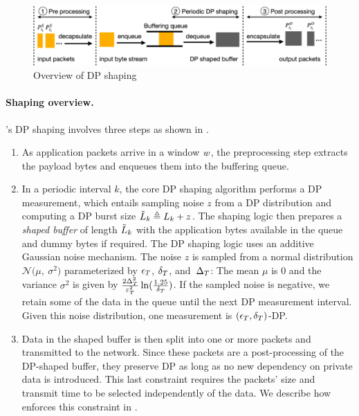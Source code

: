 \begin{figure}[t]
    \centering
    \includegraphics[width=\columnwidth]{figures/dp-overview.pdf}
    \caption{Overview of DP shaping}
    \label{fig:dp-overview}
\end{figure}

\paragraph{Shaping overview.}
\sys's DP shaping involves three steps as shown in .
\begin{enumerate}
    \item As application packets arrive in a window $w$, the preprocessing step extracts the payload bytes and enqueues them into the buffering queue.
    \item In a periodic interval $k$, the core DP shaping algorithm performs a DP measurement, which entails sampling noise $z$ from a DP distribution and computing a DP burst size $\tilde{L}_{k} \triangleq L_{k} + z$.
    The shaping logic then prepares a {\em shaped buffer} of length $\tilde{L}_{k}$ with the application bytes available in the queue and dummy bytes if required.
    The DP shaping logic uses an additive Gaussian noise mechanism.
    The noise $z$ is sampled from a normal distribution $\mathcal{N}\big(\mu,~\sigma^2\big)$ parameterized by $\epsilon_T$, $\delta_T$, and~$\Delta_T$:
    The mean $\mu$ is 0 and the variance $\sigma^2$ is given by $\frac{2\Delta_T^2}{\varepsilon_T^2}\ln(\frac{1.25}{\delta_T})$.
    If the sampled noise is negative, we retain some of the data in the queue until the next DP measurement interval.
    Given this noise distribution, one measurement is \mbox{$(\epsilon_T, \delta_T)$-DP}.
    \item Data in the shaped buffer is then split into one or more packets and transmitted to the network. Since these packets are a post-processing of the DP-shaped buffer, they preserve DP as long as no new dependency on private data is introduced. 
    This last constraint requires the packets' size and transmit time to be selected independently of the data.
    We describe how {\sys} enforces this constraint in {\addref}.
\end{enumerate}
